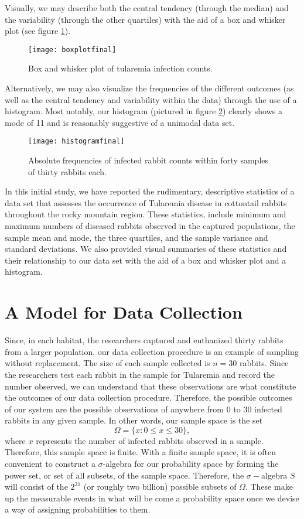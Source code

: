 \documentclass{amsart}
\begin{document}
Visually, we may describe both the central tendency (through the median) and the variability (through the other quartiles) with the aid of a box and whisker plot (see figure \ref{F:BoxAndWhiskerTularemia}).
\begin{figure}
\centering
\texttt{[image: boxplotfinal]}
\caption{Box and whisker plot of tularemia infection counts.\label{F:BoxAndWhiskerTularemia}}
\end{figure}
Alternatively, we may also visualize the frequencies of the different outcomes (as well as the central tendency and variability within the data) through the use of a histogram.  Most notably, our histogram (pictured in figure \ref{F:absoluteFrequencies}) clearly shows a mode of 11 and is reasonably suggestive of a unimodal data set.
\begin{figure}
\centering
\texttt{[image: histogramfinal]}
\caption{Absolute frequencies of infected rabbit counts within forty samples of thirty rabbits each.\label{F:absoluteFrequencies}}
\end{figure}
In this initial study, we have reported the rudimentary, descriptive statistics of a data set that assesses the occurrence of Tularemia disease in cottontail rabbits throughout the rocky mountain region.  These statistics, include minimum and maximum numbers of diseased rabbits observed in the captured populations, the sample mean and mode, the three quartiles, and the sample variance and standard deviations.  We also provided visual summaries of these statistics and their relationship to our data set with the aid of a box and whisker plot and a histogram.
\section{A Model for Data Collection}
Since, in each habitat, the researchers captured and euthanized thirty rabbits from a larger population, our data collection procedure is an example of sampling without replacement. The size of each sample collected is $n=30$ rabbits.   Since the researchers test each rabbit in the sample for Tularemia and record the number observed, we can understand that these observations are what constitute the outcomes of our data collection procedure.  Therefore, the possible outcomes of our system are the possible observations of anywhere from 0 to 30 infected rabbits in any given sample.  In other words, our sample space is the set $$\Omega=\{x: 0\le x\le 30\},$$  where $x$ represents the number of infected rabbits observed in a sample.  Therefore, this sample space is finite. With a finite sample space, it is often convenient to construct a $\sigma$-algebra for our probability space by forming the power set, or set of all subsets, of the sample space.  Therefore, the $\sigma-$algebra $S$ will consist of the  $2^{31}$ (or roughly two billion) possible subsets of $\Omega$. These make up the measurable events in what will be come a probability space once we devise a way of assigning probabilities to them.
\end{document}
